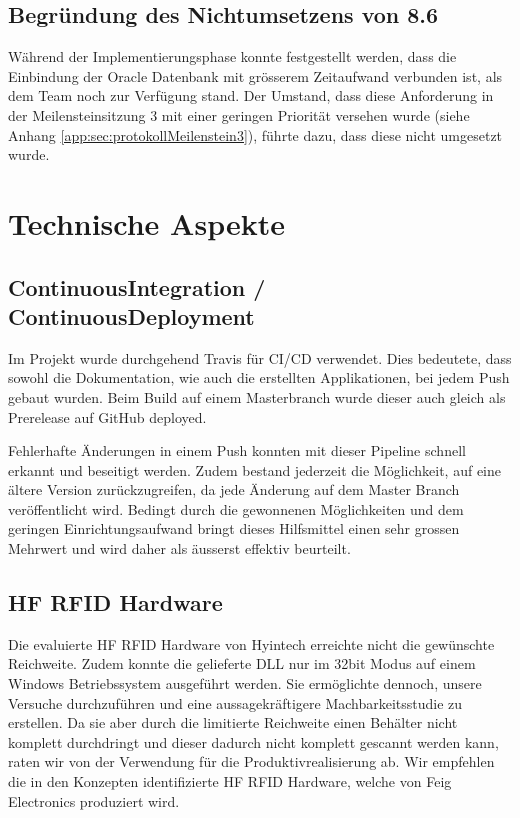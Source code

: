 \subsection{Begründung des Nichtumsetzens von 8.6}
Während der Implementierungsphase konnte festgestellt werden, dass die Einbindung der Oracle Datenbank mit grösserem Zeitaufwand verbunden ist, als dem Team noch zur Verfügung stand. Der Umstand, dass diese Anforderung in der Meilensteinsitzung 3 mit einer geringen Priorität versehen wurde (siehe Anhang \ref{app:sec:protokollMeilenstein3}), führte dazu, dass diese nicht umgesetzt wurde.

\section{Technische Aspekte}
\subsection{ContinuousIntegration / ContinuousDeployment}
Im Projekt wurde durchgehend Travis für CI/CD verwendet. Dies bedeutete, dass sowohl die Dokumentation, wie auch die erstellten Applikationen, bei jedem Push gebaut wurden. Beim Build auf einem Masterbranch wurde dieser auch gleich als Prerelease auf GitHub deployed.

Fehlerhafte Änderungen in einem Push konnten mit dieser Pipeline schnell erkannt und beseitigt werden. Zudem bestand jederzeit die Möglichkeit, auf eine ältere Version zurückzugreifen, da jede Änderung auf dem Master Branch veröffentlicht wird. Bedingt durch die gewonnenen Möglichkeiten und  dem geringen Einrichtungsaufwand bringt dieses Hilfsmittel einen sehr grossen Mehrwert und wird daher als äusserst effektiv beurteilt.

\subsection{HF RFID Hardware}
Die evaluierte \gls{HF} \gls{RFID} Hardware von Hyintech erreichte nicht die gewünschte Reichweite. Zudem konnte die gelieferte \gls{DLL} nur im 32bit Modus auf einem Windows Betriebssystem ausgeführt werden. Sie ermöglichte dennoch, unsere Versuche durchzuführen und eine aussagekräftigere Machbarkeitsstudie zu erstellen. Da sie aber durch die limitierte Reichweite einen Behälter nicht komplett durchdringt und dieser dadurch nicht komplett gescannt werden kann, raten wir von der Verwendung für die Produktivrealisierung ab. Wir empfehlen die in den Konzepten identifizierte \gls{HF} \gls{RFID} Hardware, welche von Feig Electronics produziert wird.

